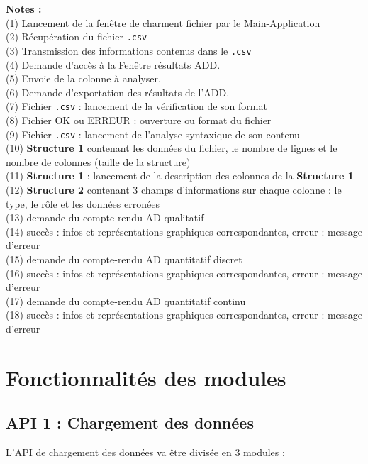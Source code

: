 		\hspace{-\parindent}\textbf{Notes :}\\
			(1) Lancement de la fenêtre de charment fichier par le Main-Application\\
			(2) Récupération du fichier \lstinline!.csv! \\
			(3) Transmission des informations contenus dans le \lstinline!.csv!\\
			(4) Demande d'accès à la Fenêtre résultats ADD.\\
			(5) Envoie de la colonne à analyser.\\
			(6) Demande d'exportation des résultats de l'ADD.\\
			(7) Fichier \lstinline!.csv! : lancement de la vérification de son format\\
			(8) Fichier OK ou ERREUR : ouverture ou format du fichier\\
			(9) Fichier \lstinline!.csv! : lancement de l'analyse syntaxique de son contenu\\
			(10) \textbf{Structure 1} contenant les données du fichier, le nombre de lignes et le nombre de colonnes (taille de la structure)\\
			(11) \textbf{Structure 1} : lancement de la description des colonnes de la \textbf{Structure 1}\\
			(12) \textbf{Structure 2} contenant 3 champs d'informations sur chaque colonne : le type, le rôle et les données erronées\\
			(13) demande du compte-rendu AD qualitatif\\
			(14) succès : infos et représentations graphiques correspondantes, erreur : message d'erreur\\
			(15) demande du compte-rendu AD quantitatif discret\\
			(16) succès : infos et représentations graphiques correspondantes, erreur : message d'erreur\\
			(17) demande du compte-rendu AD quantitatif continu\\
			(18) succès : infos et représentations graphiques correspondantes, erreur : message d'erreur\\
	
	\section{Fonctionnalités des modules}
		\subsection{API 1 : Chargement des données}
			L'API de chargement des données va être divisée en 3 modules :
			
